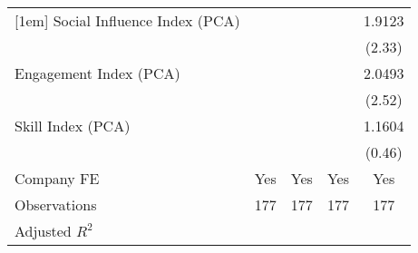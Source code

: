 {\begin{tabular}{l*{4}{c}}
[1em]
Social Influence Index (PCA)       &                   &                   &                   &    1.9123\sym{**} \\
                                   &                   &                   &                   &    (2.33)         \\
[1em]
Engagement Index (PCA)             &                   &                   &                   &    2.0493\sym{**} \\
                                   &                   &                   &                   &    (2.52)         \\
[1em]
Skill Index (PCA)                  &                   &                   &                   &    1.1604         \\
                                   &                   &                   &                   &    (0.46)         \\
[1em]
Company FE                         &       Yes         &       Yes         &       Yes         &       Yes         \\
\hline
Observations                       &       177         &       177         &       177         &       177         \\
Adjusted \(R^{2}\)                 &                   &                   &                   &                   \\
\hline\hline
\end{tabular}
}
